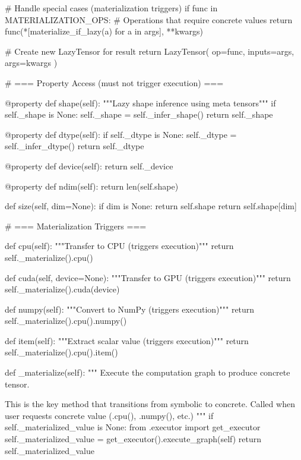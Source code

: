         # Handle special cases (materialization triggers)
        if func in MATERIALIZATION_OPS:
            # Operations that require concrete values
            return func(*[materialize_if_lazy(a) for a in args], **kwargs)
        
        # Create new LazyTensor for result
        return LazyTensor(
            op=func,
            inputs=args,
            args=kwargs
        )
    
    # === Property Access (must not trigger execution) ===
    
    @property
    def shape(self):
        """Lazy shape inference using meta tensors"""
        if self._shape is None:
            self._shape = self._infer_shape()
        return self._shape
    
    @property
    def dtype(self):
        if self._dtype is None:
            self._dtype = self._infer_dtype()
        return self._dtype
    
    @property
    def device(self):
        return self._device
    
    @property
    def ndim(self):
        return len(self.shape)
    
    def size(self, dim=None):
        if dim is None:
            return self.shape
        return self.shape[dim]
    
    # === Materialization Triggers ===
    
    def cpu(self):
        """Transfer to CPU (triggers execution)"""
        return self._materialize().cpu()
    
    def cuda(self, device=None):
        """Transfer to GPU (triggers execution)"""
        return self._materialize().cuda(device)
    
    def numpy(self):
        """Convert to NumPy (triggers execution)"""
        return self._materialize().cpu().numpy()
    
    def item(self):
        """Extract scalar value (triggers execution)"""
        return self._materialize().cpu().item()
    
    def _materialize(self):
        """
        Execute the computation graph to produce concrete tensor.
        
        This is the key method that transitions from symbolic to concrete.
        Called when user requests concrete value (.cpu(), .numpy(), etc.)
        """
        if self._materialized_value is None:
            from .executor import get_executor
            self._materialized_value = get_executor().execute_graph(self)
        return self._materialized_value
    
